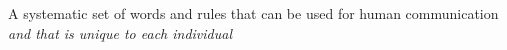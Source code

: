 A systematic set of words and rules that can be used for human communication \emph{and that is unique to each individual}
